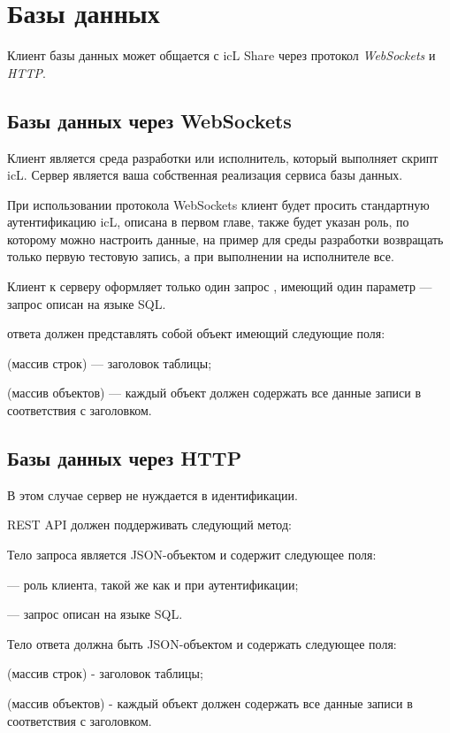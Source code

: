 \section{Базы данных}

Клиент базы данных может общается с icL Share через протокол \textit{WebSockets} и \textit{HTTP}.

\subsection{Базы данных через WebSockets}

Клиент является среда разработки или исполнитель, который выполняет скрипт icL. Сервер является ваша собственная реализация сервиса базы данных.

При использовании протокола WebSockets клиент будет просить стандартную аутентификацию icL, описана в первом главе, также будет указан роль, по которому можно настроить данные, на пример для среды разработки возвращать только первую тестовую запись, а при выполнении на исполнителе все.

Клиент к серверу оформляет только один запрос , имеющий один параметр  — запрос описан на языке SQL.

 ответа должен представлять собой объект имеющий следующие поля:

\begin{icItems}
	\item {} (массив строк) — заголовок таблицы;
	\item {} (массив объектов) — каждый объект должен содержать все данные записи в соответствия с заголовком.
\end{icItems}

\subsection{Базы данных через HTTP}

В этом случае сервер не нуждается в идентификации.

REST API должен поддерживать следующий метод:


Тело запроса является JSON-объектом и содержит следующее поля:

\begin{icItems}
	\item {} — роль клиента, такой же как и при аутентификации;
	\item {} — запрос описан на языке SQL.
\end{icItems}

Тело ответа должна быть JSON-объектом и содержать следующее поля:

\begin{icItems}
	\item {} (массив строк) - заголовок таблицы;
	\item {} (массив объектов) - каждый объект должен содержать все данные записи в соответствия с заголовком.
\end{icItems}

